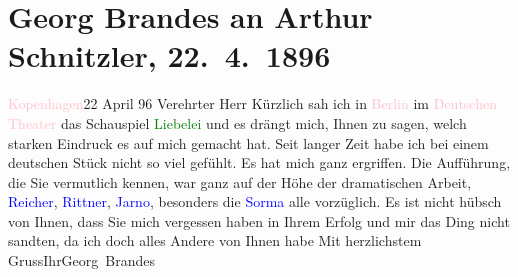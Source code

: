 

               \section[Georg Brandes an Arthur Schnitzler, 22. 4. 1896]{ Georg Brandes an Arthur Schnitzler, 22. 4. 1896}\nopagebreak{}\rehead{ }\normalsize\beginnumbering{} \toendnotes[C]{\smallbreak\pagebreak[2]} 
\pstart
           \raggedleft{}{\pb}\textcolor{pink}{Kopenhagen}{}\ledrightnote{\textcolor{pink}{Kopenhagen}}{ }22 April 96\pend
           \pstart{}Verehrter Herr\pend\pstart
           Kürzlich sah ich in \textcolor{pink}{Berlin}{}\ledrightnote{\textcolor{pink}{Österreich}} im \textcolor{pink}{Deutschen Theater}{}\ledrightnote{\textcolor{pink}{Deutsches Theater Berlin}} das Schauspiel \textcolor{green}{Liebelei}{}\ledrightnote{\textcolor{green}{Liebelei. Schauspiel in drei Akten}} und es drängt mich, Ihnen zu sagen, welch
                    starken Eindruck es auf mich gemacht hat. Seit langer Zeit habe ich bei einem
                    deutschen Stück nicht so viel gefühlt. Es hat mich ganz ergriffen. Die
                    Aufführung, die Sie vermutlich kennen, war ganz auf der Höhe der dramatischen
                    Arbeit, \textcolor{blue}{Reicher}{}\ledrightnote{\textcolor{blue}{Emanuel Reicher}}, \textcolor{blue}{Rittner}{}\ledrightnote{\textcolor{blue}{Rudolf Rittner}}, \textcolor{blue}{Jarno}{}\ledrightnote{\textcolor{blue}{Josef Jarno}}, besonders die
                        \textcolor{blue}{Sorma}{}\ledrightnote{\textcolor{blue}{Agnes Sorma}} alle vorzüglich.\pend
           \pstart
           Es ist nicht hübsch von Ihnen, dass Sie mich vergessen haben in Ihrem Erfolg und
                        mir das Ding
                    nicht sandten, da ich doch alles Andere von Ihnen habe\pend
           \pstart Mit herzlichstem Gruss\hspace*{3.5em}Ihr\hspace*{3.5em}\spacefill\mbox{Georg Brandes}\pend{}\endnumbering{}  
      